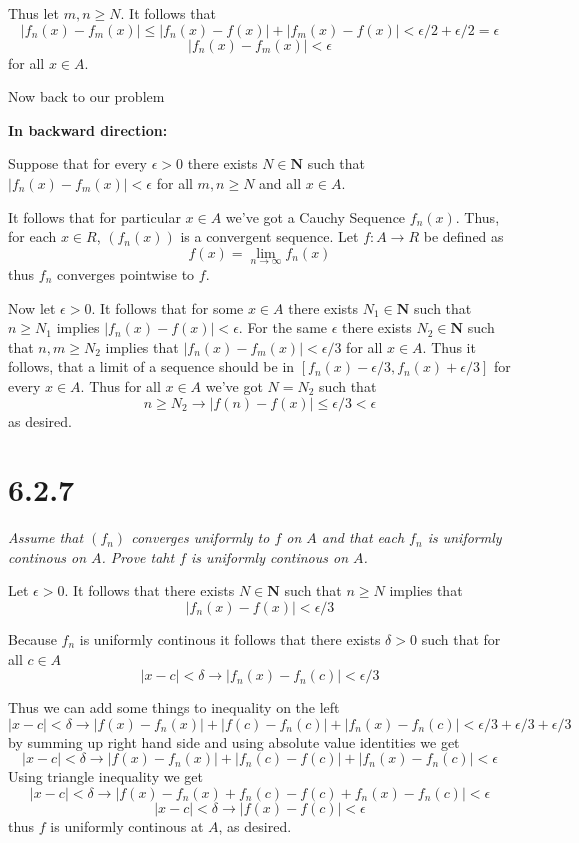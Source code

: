 \documentclass[11pt,oneside,titlepage]{book}
\begin{document}
Thus let $m, n \geq N$. It follows that
$$|f_n(x) - f_m(x)| \leq |f_n(x) - f(x)| + |f_m(x) - f(x)| < \epsilon/2 + \epsilon/2 = \epsilon$$
$$|f_n(x) - f_m(x)| <  \epsilon$$
for all $x \in A$.

Now back to our problem

\textbf{In backward direction:}

Suppose that for every $\epsilon > 0$ there exists $N \in \textbf{N}$ such
that $|f_n(x) - f_m(x)| < \epsilon$ for all $m, n \geq N$ and all $x \in A$.

It follows that for particular $x \in A$ we've got a Cauchy Sequence
$f_n(x)$. Thus, for each $x \in R$, $(f_n(x))$ is a convergent sequence.
Let $f: A \to R$ be defined as
$$f(x) = \lim_{n \to \infty}f_n(x)$$
thus $f_n$ converges pointwise to $f$.

Now let $\epsilon > 0$. It follows that for some $x \in A$ there exists
$N_1 \in \textbf{N}$ such that $n \geq N_1$ implies
$|f_n(x) - f(x)| < \epsilon$. For the same $\epsilon$ there exists
$N_2 \in \textbf{N}$ such that $n, m \geq N_2$ implies that
$|f_n(x) - f_m(x)| < \epsilon/3$ for all $x \in A$. Thus
it follows, that a limit of a sequence should be in $[f_n(x) - \epsilon/3,
f_n(x) + \epsilon/3]$ for every $x \in A$. Thus for all $x \in A$
we've got $N = N_2$ such that
$$n \geq N_2 \to |f(n) - f(x)| \leq \epsilon/ 3 < \epsilon$$
as desired.

\section*{6.2.7}
\textit{Assume that $(f_n)$ converges uniformly to $f$ on $A$ and that each
  $f_n$ is uniformly continous on $A$. Prove taht $f$ is uniformly continous
  on $A$.}

Let $\epsilon > 0$. It follows that there exists $N \in \textbf{N}$ such that
$n \geq N$ implies that
$$|f_n(x) - f(x)| < \epsilon/3$$

Because $f_n$ is
uniformly continous it follows that there exists $\delta > 0$ such that
for all $c \in A$
$$|x - c| < \delta  \to |f_n(x) - f_n(c)| < \epsilon/3$$

Thus we can add some things to inequality on the left
$$|x - c| < \delta  \to |f(x) - f_n(x)| +
| f(c) - f_n(c) | + |f_n(x) - f_n(c)| < \epsilon/3 + \epsilon/3 + \epsilon/3$$
by summing up right hand side and using absolute value identities we get
$$|x - c| < \delta  \to |f(x) - f_n(x)| +
| f_n(c) - f(c) | + |f_n(x) - f_n(c)| < \epsilon$$
Using triangle inequality we get
$$|x - c| < \delta  \to |f(x) - f_n(x) +
f_n(c) - f(c)  + f_n(x) - f_n(c)| < \epsilon$$
$$|x - c| < \delta  \to |f(x) - f(c)| < \epsilon$$
thus $f$ is uniformly continous at $A$, as desired.
\end{document}
